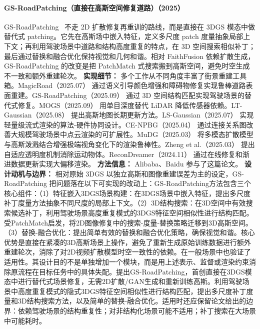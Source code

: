 \paragraph{GS-RoadPatching（直接在高斯空间修复道路）（2025）}
GS-RoadPatching~\cite{2509_19937} 不走 2D 扩散修复再重训的路线，而是直接在 3DGS 模态中做替代式 patching。它先在高斯场中嵌入特征，定义多尺度 patch 度量抽象局部上下文；再利用驾驶场景中道路和结构高度重复的特点，在 3D 空间搜索相似补丁；最后通过替换和融合优化保持视觉和几何和谐。相对 FaithFusion 依赖扩散生成，GS-RoadPatching 的改变是把 PatchMatch 式搜索搬到高斯空间，避免时空生成不一致和额外重建轮次。
\textbf{实现细节：} 多个工作从不同角度丰富了街景重建工具箱。MagicRoad（2025.07） 通过语义引导颜色增强和障碍物修复实现鲁棒道路表面重建。GS-RoadPatching（2025.09） 通过 3D 空间结构匹配实现驾驶场景的替代式修复。MOGS（2025.09） 用单目深度替代 LiDAR 降低传感器依赖。LT-Gaussian（2025.08） 提出高斯地图长期更新方法。LS-Gaussian（2025.07） 实现轻量级流式渲染的算法-硬件协同设计。CE-NPBG（2025.04） 通过连接关系图改善大规模驾驶场景中点云渲染的可扩展性。MuDG（2025.03） 将多模态扩散模型与高斯泼溅结合增强极端视角变化下的渲染鲁棒性。Zheng et al.（2025.03） 提出自适应透明度机制消除运动物体。ReconDreamer（2024.11） 通过在线修复和渐进数据更新实现大偏移渲染。
\textbf{方法信息：} Alibaba、Baidu 参与了这篇论文。
\textbf{设计动机与边界：} 相对原始 3DGS 以独立高斯和图像重建误差为主的设定，GS-RoadPatching 把问题落在以下可实现的改动上：GS-RoadPatching方法包含三个核心组件：（1）特征嵌入3DGS场景构建：在3DGS场景中嵌入特征，提出多尺度补丁度量方法抽象不同尺度的局部上下文。（2）3D结构搜索：在3D空间中有效搜索候选补丁，利用驾驶场景高度重复模式的3DGS特征空间相似性进行结构匹配。受PatchMatch启发，将2D图像修复中的搜索-度量-替换策略迁移到3D高斯空间。（3）替换-融合优化：提出简单有效的替换和融合优化策略，确保视觉和谐。核心优势是直接在紧凑的3D高斯场景上操作，避免了重新生成原始训练数据进行额外重建轮次，消除了对2D视频扩散模型时空一致性的依赖。在一般场景中也验证了适用性。其设计目的不是单独增加一个模块，而是用上述表示、监督或渲染约束消除原流程在目标任务中的具体失配。提出GS-RoadPatching，首创直接在3DGS模态中进行替代式场景修复，无需2D扩散/GAN生成和重新训练高斯。利用驾驶场景中高度重复模式的隐式3DGS特征空间相似性进行结构匹配，提出多尺度补丁度量和3D结构搜索方法，以及简单的替换-融合优化。适用时还应保留论文给出的边界：依赖驾驶场景的结构重复性；对非结构化场景可能不适用；补丁搜索在大场景中可能耗时。
